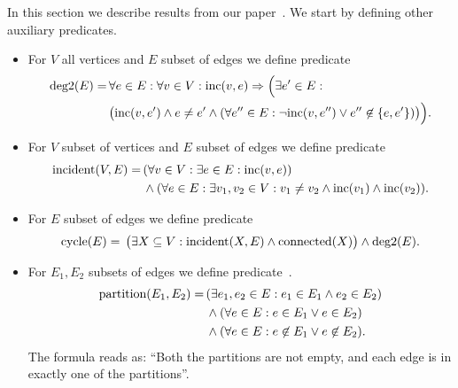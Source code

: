 In this section we describe results from our paper~\cite{my_paper}.
We start by defining other auxiliary predicates.

\begin{itemize}
	\item For \( V \) all vertices and \( E \) subset of edges we define predicate
	      \begin{align}
		      \text{deg2}(E) = \,
		       & \forall e \in E : \forall v \in V : \text{inc} (v, e) \Rightarrow \Big( \exists e^\prime \in E : \notag \\
		       & \big( \text{inc} (v, e^\prime) \land e \ne e^\prime \land (\forall e^{\prime\prime} \in E :
				      \lnot \text{inc} (v, e^{\prime\prime}) \lor e^{\prime\prime} \not\in \{e, e^\prime\}) \big) \Big). \notag
	      \end{align}
	\item For \( V \) subset of vertices and \( E \) subset of edges we define predicate
	      \begin{align}
		      \text{incident}(V, E) = \,
		       & (\forall v \in V : \exists e \in E : \text{inc} (v, e)) \notag                                                 \\
		       & \land (\forall e \in E : \exists v_1, v_2 \in V : v_1 \ne v_2 \land \text{inc} (v_1) \land \text{inc} (v_2)). \notag
	      \end{align}
	\item For \( E \) subset of edges we define predicate
	      \begin{align}
		      \text{cycle}(E) = \,
		      \big( \exists X \subseteq V : \text{incident}(X, E) \land \text{connected}(X) \big)
		      \land \text{deg2}(E). \notag
	      \end{align}
	\item For \( E_1, E_2 \) subsets of edges we define predicate~\cite{my_paper}.
	      \begin{align}
		      \text{partition}(E_1, E_2) = \, & (\exists e_1, e_2 \in E : e_1 \in E_1 \land e_2 \in E_2 ) \notag    \\
		                                      & \land (\forall e \in E : e \in E_1 \lor e \in E_2 ) \notag          \\
		                                      & \land (\forall e \in E : e \not\in E_1 \lor e \not\in E_2 ). \notag
	      \end{align}
	      The formula reads as: ``Both the partitions are not empty,
	      and each edge is in exactly one of the partitions''.

\end{itemize}
